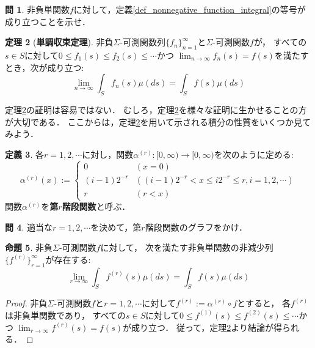 \documentclass{jsreport}
\theoremstyle{definition}
\newtheorem{defi}{定義}[section]
\newtheorem{prop}[defi]{命題}
\newtheorem{thm}[defi]{定理}
\newtheorem{qst}[defi]{問}
\begin{document}
\begin{qst}\label{qst_nonnegative_function_integral_and_simple_function}
非負単関数$f$に対して，定義\ref{def_nonnegative_function_integral}の等号が成り立つことを示せ．
\end{qst}

\begin{thm}[\textbf{単調収束定理}]\label{monotone_convergence_theorem}
非負$\Sigma$-可測関数列$\{f_n\}_{n=1}^\infty$と$\Sigma$-可測関数$f$が，
すべての$s \in S$に対して$0 \leq f_1(s) \leq f_2(s) \leq\cdots$かつ
$\displaystyle\lim_{n\to\infty}f_n(s)=f(s)$を満たすとき，次が成り立つ:
\[ \lim_{n\to\infty}\int_S f_n(s)\mu(ds)=\int_S f(s)\mu(ds) \]
\end{thm}

定理\ref{monotone_convergence_theorem}の証明は容易ではない．
むしろ，定理\ref{monotone_convergence_theorem}を様々な証明に生かせることの方が大切である．
ここからは，定理\ref{monotone_convergence_theorem}を用いて示される積分の性質をいくつか見てみよう．

\begin{defi}\label{def_staircase_function}
各$r=1,2,\cdots$に対し，関数$\alpha^{(r)}\colon[0,\infty)\to[0,\infty)$を次のように定める:
\[ \alpha^{(r)}(x):=\begin{cases}
0 & (x=0) \\
(i-1)2^{-r} & ((i-1)2^{-r}<x \leq i2^{-r} \leq r, i=1,2,\cdots) \\
r & (r<x)
\end{cases} \]
関数$\alpha^{(r)}$を\textbf{第$r$階段関数}と呼ぶ．
\end{defi}

\begin{qst}\label{qst_staircase_function}
適当な$r=1,2,\cdots$を決めて，第$r$階段関数のグラフをかけ．
\end{qst}

\begin{prop}\label{prop_approximation_of_nonnegative_function_integral}
非負$\Sigma$-可測関数$f$に対して，
次を満たす非負単関数の非減少列$\{f^{(r)}\}_{r=1}^\infty$が存在する:
\[ \lim_{r\to\infty}\int_Sf^{(r)}(s)\mu(ds)=\int_Sf(s)\mu(ds) \]
\end{prop}

\begin{proof}
非負$\Sigma$-可測関数$f$と$r=1,2,\cdots$に対して$f^{(r)}:=\alpha^{(r)} \circ f$とすると，
各$f^{(r)}$は非負単関数であり，
すべての$s \in S$に対して$0 \leq f^{(1)}(s) \leq f^{(2)}(s) \leq\cdots$かつ
$\displaystyle\lim_{r\to\infty}f^{(r)}(s)=f(s)$が成り立つ．
従って，定理\ref{monotone_convergence_theorem}より結論が得られる．
\end{proof}
\end{document}
